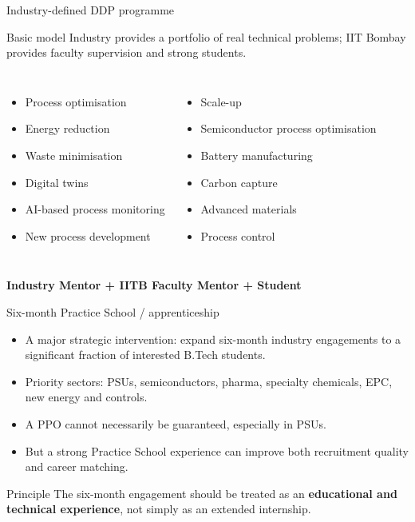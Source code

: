 \documentclass[aspectratio=169,11pt]{beamer}
\newcommand{\key}[1]{\textbf{\color{IITblue}#1}}
\begin{document}
\begin{frame}{Industry-defined DDP programme}
\begin{block}{Basic model}
Industry provides a portfolio of real technical problems; IIT Bombay provides faculty supervision and strong students.
\end{block}
\begin{columns}[T]
\begin{itemize}
\item Process optimisation
\item Energy reduction
\item Waste minimisation
\item Digital twins
\item AI-based process monitoring
\item New process development
\end{itemize}
\begin{itemize}
\item Scale-up
\item Semiconductor process optimisation
\item Battery manufacturing
\item Carbon capture
\item Advanced materials
\item Process control
\end{itemize}
\end{columns}
\vspace{3mm}
\begin{center}\Large\key{Industry Mentor + IITB Faculty Mentor + Student}\end{center}
\end{frame}

\begin{frame}{Six-month Practice School / apprenticeship}
\begin{itemize}
\item A major strategic intervention: expand six-month industry engagements to a significant fraction of interested B.Tech students.
\item Priority sectors: PSUs, semiconductors, pharma, specialty chemicals, EPC, new energy and controls.
\item A PPO cannot necessarily be guaranteed, especially in PSUs.
\item But a strong Practice School experience can improve both recruitment quality and career matching.
\end{itemize}
\vspace{5mm}
\begin{block}{Principle}
The six-month engagement should be treated as an \key{educational and technical experience}, not simply as an extended internship.
\end{block}
\end{frame}
\end{document}
